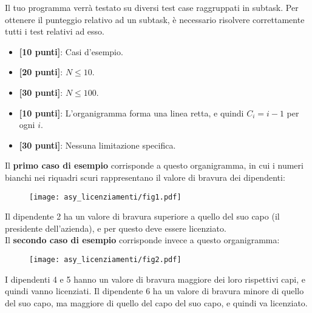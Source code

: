 \Scoring
Il tuo programma verrà testato su diversi test case raggruppati in subtask.
Per ottenere il punteggio relativo ad un subtask, è necessario risolvere
correttamente tutti i test relativi ad esso.

\begin{itemize}[nolistsep,itemsep=2mm]
  \item \textbf{ [10 punti]}: Casi d'esempio.
  \item \textbf{ [20 punti]}: $N \leq 10$.
  \item \textbf{ [30 punti]}: $N \leq 100$.
  \item \textbf{ [10 punti]}: L'organigramma forma una linea retta, e quindi $C_i = i-1$ per ogni $i$.
  \item \textbf{ [30 punti]}: Nessuna limitazione specifica.
\end{itemize}

\Examples
\begin{example}
%
\end{example}
\begin{example}
%
\end{example}


\Explanation
Il \textbf{primo caso di esempio} corrisponde a questo organigramma, in cui i numeri bianchi nei riquadri scuri rappresentano il valore di bravura dei dipendenti:
\begin{figure}[H]%
\centering\texttt{[image: asy\_licenziamenti/fig1.pdf]}%
\end{figure}
Il dipendente 2 ha un valore di bravura superiore a quello del suo capo (il presidente dell'azienda), e per questo deve essere licenziato.\\[2mm]
Il \textbf{secondo caso di esempio} corrisponde invece a questo organigramma:
\begin{figure}[H]%
\centering\texttt{[image: asy\_licenziamenti/fig2.pdf]}%
\end{figure}
I dipendenti 4 e 5 hanno un valore di bravura maggiore dei loro rispettivi capi, e quindi vanno licenziati. Il dipendente 6 ha un valore di bravura minore di quello del suo capo, ma maggiore di quello del capo del suo capo, e quindi va licenziato.